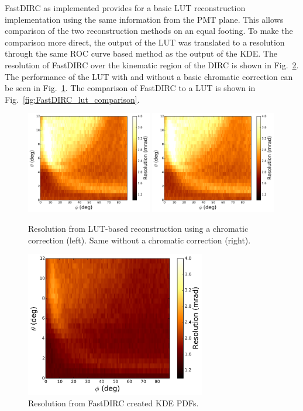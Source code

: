 FastDIRC as implemented provides for a basic LUT reconstruction implementation using the same information from the PMT plane.  This allows comparison of the two reconstruction methods on an equal footing.  To make the comparison more direct, the output of the LUT was translated to a resolution through the same ROC curve based method as the output of the KDE.  The resolution of FastDIRC over the kinematic region of the DIRC is shown in Fig.~\ref{fig:FastDIRC_performance}.  The performance of the LUT with and without a basic chromatic correction can be seen in Fig.~\ref{fig:lut_performance}.  The comparison of FastDIRC to a LUT is shown in Fig.~\ref{fig:FastDIRC_lut_comparison}.

\begin{figure}[!h]
\centering
\includegraphics[width=0.49\textwidth]{pics/lut_map_chrom.pdf}
\includegraphics[width=0.49\textwidth]{pics/lut_map_nochrom.pdf}
\caption{Resolution from LUT-based reconstruction using a chromatic correction (left).  Same without a chromatic correction (right).}
\label{fig:lut_performance}
\end{figure}

\begin{figure}[!h]
\centering
\includegraphics[width=0.7\textwidth]{pics/kde_map.pdf}
\caption{Resolution from FastDIRC created KDE PDFs.}
\label{fig:FastDIRC_performance}
\end{figure}

